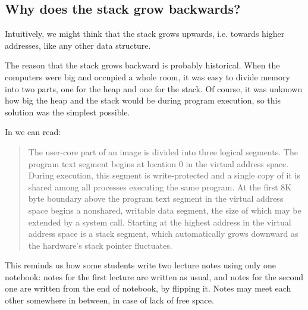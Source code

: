 \subsection{Why does the stack grow backwards?}
\label{stack_grow_backwards}

Intuitively, we might think that the stack grows upwards, i.e. towards higher addresses, like any other data structure.

The reason that the stack grows backward is probably historical.
When the computers were big and occupied a whole room, it was easy to divide memory into two parts, one for the \gls{heap} and one for the stack.
Of course, it was unknown how big the \gls{heap} and the stack would be during program execution, so this solution was the simplest possible.



In \RitchieThompsonUNIX we can read:

\begin{framed}
\begin{quotation}
The user-core part of an image is divided into three logical segments. The program text segment begins at location 0 in the virtual address space. During execution, this segment is write-protected and a single copy of it is shared among all processes executing the same program. At the first 8K byte boundary above the program text segment in the virtual address space begins a nonshared, writable data segment, the size of which may be extended by a system call. Starting at the highest address in the virtual address space is a stack segment, which automatically grows downward as the hardware's stack pointer fluctuates.
\end{quotation}
\end{framed}

This reminds us how some students write two lecture notes using only one notebook:
notes for the first lecture are written as usual, 
and notes for the second one are written from the end of notebook, by flipping it.
Notes may meet each other somewhere in between, in case of lack of free space.


